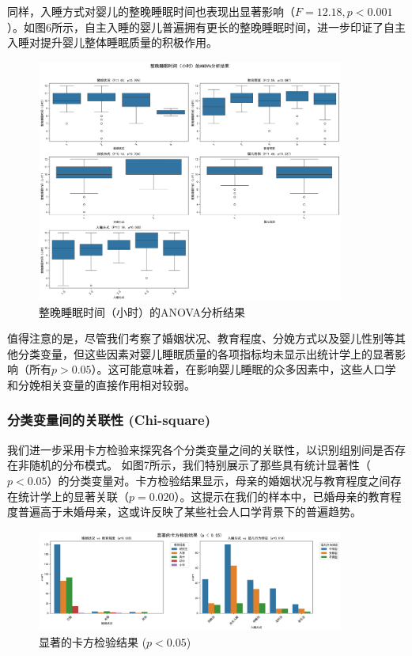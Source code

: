 \documentclass[withoutpreface,bwprint]{cumcmthesis}
\begin{document}
同样，入睡方式对婴儿的整晚睡眠时间也表现出显著影响（$F=12.18, p<0.001$）。如图6所示，自主入睡的婴儿普遍拥有更长的整晚睡眠时间，进一步印证了自主入睡对提升婴儿整体睡眠质量的积极作用。

\begin{figure}[htbp]
    \centering
    \includegraphics[width=0.9\textwidth]{figures/anova_整晚睡眠时间（小时）_combined.png}
    \caption{整晚睡眠时间（小时）的ANOVA分析结果}
    \label{fig:anova_sleep_time}
\end{figure}

值得注意的是，尽管我们考察了婚姻状况、教育程度、分娩方式以及婴儿性别等其他分类变量，但这些因素对婴儿睡眠质量的各项指标均未显示出统计学上的显著影响（所有$p>0.05$）。这可能意味着，在影响婴儿睡眠的众多因素中，这些人口学和分娩相关变量的直接作用相对较弱。

\subsubsection{分类变量间的关联性 (Chi-square)}
我们进一步采用卡方检验来探究各个分类变量之间的关联性，以识别组别间是否存在非随机的分布模式。
如图7所示，我们特别展示了那些具有统计显著性（$p<0.05$）的分类变量对。卡方检验结果显示，母亲的婚姻状况与教育程度之间存在统计学上的显著关联（$p=0.020$）。这提示在我们的样本中，已婚母亲的教育程度普遍高于未婚母亲，这或许反映了某些社会人口学背景下的普遍趋势。

\begin{figure}[htbp]
    \centering
    \includegraphics[width=0.9\textwidth]{figures/chi_square_significant_results.png}
    \caption{显著的卡方检验结果 ($p < 0.05$)}
    \label{fig:chi_square_significant}
\end{figure}
\end{document}
